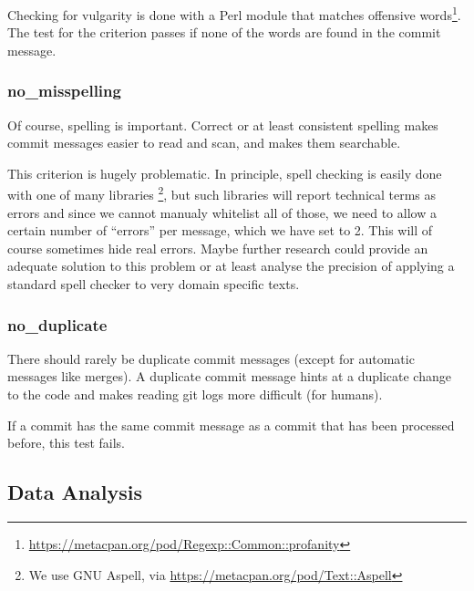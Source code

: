 Checking for vulgarity is done with a Perl module that matches offensive words\footnote{\url{https://metacpan.org/pod/Regexp::Common::profanity}}. The test for the criterion passes if none of the words are found in the commit message.

\subsubsection{no\_misspelling}
\label{subs:no_misspelling}
Of course, spelling is important. Correct or at least consistent spelling makes commit messages easier to read and scan, and makes them searchable.

This criterion is hugely problematic. In principle, spell checking is easily done with one of many libraries \footnote{We use GNU Aspell, via \url{https://metacpan.org/pod/Text::Aspell}}, but such libraries will report technical terms as errors and since we cannot manualy whitelist all of those, we need to allow a certain number of ``errors'' per message, which we have set to 2. This will of course sometimes hide real errors. Maybe further research could provide an adequate solution to this problem or at least analyse the precision of applying a standard spell checker to very domain specific texts.

\subsubsection{no\_duplicate}
\label{subs:no_duplicate}
There should rarely be duplicate commit messages (except for automatic messages like merges). A duplicate commit message hints at a duplicate change to the code and makes reading git logs more difficult (for humans).

If a commit has the same commit message as a commit that has been processed before, this test fails.


\subsection{Data Analysis}
\label{sec:data-analysis}

%
%
%
%
%
%

